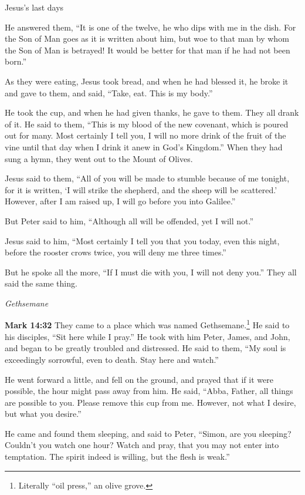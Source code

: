 \documentclass[10pt,twoside]{book}
\newcommand{\quotesize}{\normalsize{}}
\newenvironment{quotetext}{\begingroup\quotesize}{\endgroup}
\newcommand{\bible}[2]{\begin{quotetext}\textbf{#1} #2\end{quotetext}}
\newcommand{\gospelmark}[2]{\bible{Mark #1}{#2}}
\newcommand{\subhead}[1]{\emph{#1}\par}
\begin{document}
\begin{section}{Jesus's last days}
{  He answered them, ``It is one of the twelve, he who dips with me in the dish.    For the Son of Man goes as it is written about him, but woe to that man by whom the Son of Man is betrayed! It would be better for that man if he had not been born.''

  As they were eating, Jesus took bread, and when he had blessed it, he broke it and gave to them, and said, ``Take, eat. This is my body.''

  He took the cup, and when he had given thanks, he gave to them. They all drank of it.   He said to them, ``This is my blood of the new covenant, which is poured out for many.    Most certainly I tell you, I will no more drink of the fruit of the vine until that day when I drink it anew in God's Kingdom.''   When they had sung a hymn, they went out to the Mount of Olives.

  Jesus said to them, ``All of you will be made to stumble because of me tonight, for it is written, `I will strike the shepherd, and the sheep will be scattered.'    However, after I am raised up, I will go before you into Galilee.''

  But Peter said to him, ``Although all will be offended, yet I will not.''

  Jesus said to him, ``Most certainly I tell you that you today, even this night, before the rooster crows twice, you will deny me three times.''

  But he spoke all the more, ``If I must die with you, I will not deny you.'' They all said the same thing.
}

\subhead{Gethsemane}

\gospelmark{14:32}{
  They came to a place which was named Gethsemane.\footnote{Literally ``oil press,'' an olive grove.}
He said to his disciples, ``Sit here while I pray.''   He took with him Peter, James, and John, and began to be greatly troubled and distressed.   He said to them, ``My soul is exceedingly sorrowful, even to death. Stay here and watch.''

  He went forward a little, and fell on the ground, and prayed that if it were possible, the hour might pass away from him.   He said, ``Abba, Father, all things are possible to you. Please remove this cup from me. However, not what I desire, but what you desire.''

  He came and found them sleeping, and said to Peter, ``Simon, are you sleeping? Couldn't you watch one hour?    Watch and pray, that you may not enter into temptation. The spirit indeed is willing, but the flesh is weak.''

}
\end{section}
\end{document}
